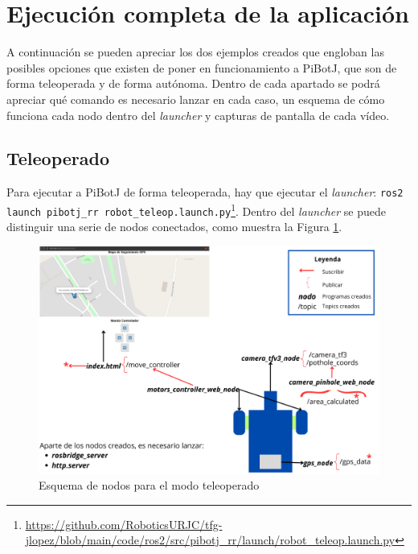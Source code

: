 \section{Ejecución completa de la aplicación}
\label{sec:expcompleto}
A continuación se pueden apreciar los dos ejemplos creados que engloban las posibles opciones que existen de poner en funcionamiento a PiBotJ, que son de forma teleoperada y de forma autónoma. Dentro de cada apartado se podrá apreciar qué comando es necesario lanzar en cada caso, un esquema de cómo funciona cada nodo dentro del \textit{launcher} y capturas de pantalla de cada vídeo.

\subsection{Teleoperado}

Para ejecutar a PiBotJ de forma teleoperada, hay que ejecutar el \textit{launcher}: \verb|ros2 launch pibotj_rr robot_teleop.launch.py|\footnote{\url{https://github.com/RoboticsURJC/tfg-jlopez/blob/main/code/ros2/src/pibotj_rr/launch/robot_teleop.launch.py}}. Dentro del \textit{launcher} se puede distinguir una serie de nodos conectados, como muestra la Figura \ref{fig:nodosteleop}. 

\begin{figure} [h!]
	\begin{center}
			\includegraphics[width=15cm]{figs/cap7/esquema_nodos_teleop_ampliado.png}
		\end{center}
	\caption{Esquema de nodos para el modo teleoperado}
	\label{fig:nodosteleop}
\end{figure}
 
